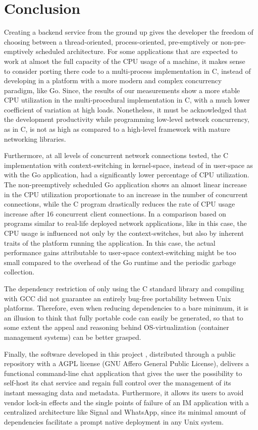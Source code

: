 \section{Conclusion}
Creating a backend service from the ground up gives the developer the freedom of choosing between a thread-oriented, process-oriented, pre-emptively or non-pre-emptively scheduled architecture. For some applications that are expected to work at almost the full capacity of the CPU usage of a machine, it makes sense to consider porting there code to a multi-process implementation in C, instead of developing in a platform with a more modern and complex concurrency paradigm, like Go. Since, the results of our measurements show a more stable CPU utilization in the multi-procedural implementation in C, with a much lower coefficient of variation at high loads.  Nonetheless, it must be acknowledged that the development productivity while programming low-level network concurrency, as in C, is not as high as compared to a high-level framework with mature networking libraries.

Furthermore, at all levels of concurrent network connections tested, the C implementation with context-switching in kernel-space, instead of in user-space as with the Go application, had a significantly lower percentage of CPU utilization. The non-preemptively scheduled Go application shows an almost linear increase in the CPU utilization proportionate to an increase in the number of concurrent connections, while the C program drastically reduces the rate of CPU usage increase after 16 concurrent client connections. In a comparison based on programs similar to real-life deployed network applications, like in this case, the CPU usage is influenced not only by the context-switches, but also by inherent traits of the platform running the application. In this case, the actual performance gains attributable to user-space context-switching might be too small compared to the overhead of the Go runtime and the periodic garbage collection.

The dependency restriction of only using the C standard library and compiling with GCC did not guarantee an entirely bug-free portability between Unix platforms. Therefore, even when reducing dependencies to a bare minimum, it is an illusion to think that fully portable code can easily be generated, so that to some extent the appeal and reasoning behind OS-virtualization (container management systems) can be better grasped.

Finally, the software developed in this project \cite{Rodriguez2022}, distributed through a public repository with a AGPL license (GNU Affero General Public License), delivers a functional command-line chat application that gives the user the possibility to self-host its chat service and regain full control over the management of its instant messaging data and metadata. Furthermore, it allows its users to avoid vendor lock-in effects and the single points of failure of an IM application with a centralized architecture like Signal and WhatsApp, since its minimal amount of dependencies facilitate a prompt native deployment in any Unix system.